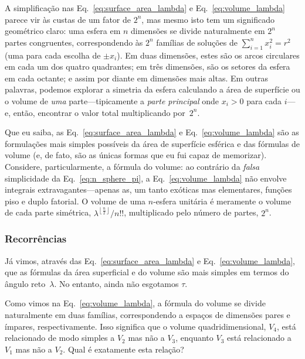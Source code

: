 A simplificação nas Eq.~\eqref{eq:surface_area_lambda} e Eq.~\eqref{eq:volume_lambda} parece vir às custas de um fator de $2^n$, mas mesmo isto tem um significado geométrico claro: uma esfera em $n$ dimensões se divide naturalmente em $2^n$ partes congruentes, correspondendo às $2^n$ famílias de soluções de $\sum_{i=1}^{n} x_i^2 = r^2$ (uma para cada escolha de $\pm x_i$). Em duas dimensões, estes são os arcos circulares em cada um dos quatro quadrantes; em três dimensões, são os setores da esfera em cada octante; e assim por diante em dimensões mais altas. Em outras palavras, podemos explorar a simetria da esfera calculando a área de superfície ou o volume de \emph{uma} parte---tipicamente a \emph{parte principal} onde $x_i > 0$ para cada $i$---e, então, encontrar o valor total multiplicando por~$2^n$.

Que eu saiba, as Eq.~\eqref{eq:surface_area_lambda} e Eq.~\eqref{eq:volume_lambda} são as formulações mais simples possíveis da área de superfície esférica e das fórmulas de volume (e, de fato, são as únicas formas que eu fui capaz de memorizar). Considere, particularmente, a fórmula do volume: ao contrário da \emph{falsa} simplicidade da Eq.~\eqref{eq:n_sphere_pi}, a Eq.~\eqref{eq:volume_lambda} não envolve integrais extravagantes---apenas as, um tanto exóticas mas elementares, funções piso e duplo fatorial. O volume de uma $n$-esfera unitária é meramente o volume de cada parte simétrica, $\lambda^{\left\lfloor \frac{n}{2} \right\rfloor}/n!!$, multiplicado pelo número de partes, $2^n$.


\subsubsection{Recorrências} %
\label{sec:recurrences}

Já vimos, através das Eq.~\eqref{eq:surface_area_lambda} e Eq.~\eqref{eq:volume_lambda}, que as fórmulas da área superficial e do volume são mais simples em termos do ângulo reto~$\lambda$. No entanto, ainda não esgotamos $\tau$.

Como vimos na Eq.~\eqref{eq:volume_lambda}, a fórmula do volume se divide naturalmente em duas famílias, correspondendo a espaços de dimensões pares e ímpares, respectivamente. Isso significa que o volume quadridimensional, $V_4$, está relacionado de modo simples a $V_2$ mas não a $V_3$, enquanto $V_3$ está relacionado a $V_1$ mas não a $V_2$. Qual é exatamente esta relação?

